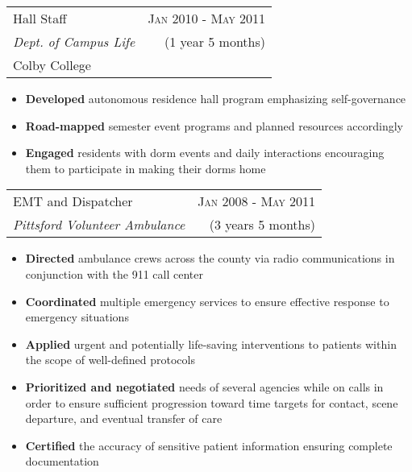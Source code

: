 \documentclass[10pt]{article} %
\begin{document}
{\begin{minipage}[t]{0.5\textwidth}

\begin{tabularx}{\linewidth}{ X r }
  {\large Hall Staff } & {\textsc{Jan 2010 - May 2011}} \\
  {\small{\textit{Dept. of Campus Life}}} & {\small{(1 year 5 months)}} \\
  {\small{Colby College}} 
\end{tabularx}
\begin{itemize}
  \item \textbf{Developed} autonomous residence hall program emphasizing self-governance
  \item \textbf{Road-mapped} semester event programs and planned resources accordingly
  \item \textbf{Engaged} residents with dorm events and daily interactions encouraging them to participate in making their dorms home
\end{itemize}


\begin{tabularx}{\linewidth}{ X r }
  {\large EMT and Dispatcher } & {\textsc{Jan 2008 - May 2011}} \\
  {\small\textit{Pittsford Volunteer Ambulance}} & {\small{(3 years 5 months)}}
\end{tabularx}
\begin{itemize}
  \item \textbf{Directed} ambulance crews across the county via radio communications in conjunction with the 911 call center
  \item \textbf{Coordinated} multiple emergency services to ensure effective response to emergency situations
  \item \textbf{Applied} urgent and potentially life-saving interventions to patients within the scope of well-defined protocols
\item \textbf{Prioritized and negotiated} needs of several agencies while on calls in order to ensure sufficient progression toward time targets for contact, scene departure, and eventual transfer of care
  \item \textbf{Certified} the accuracy of sensitive patient information ensuring complete documentation
\end{itemize}


\end{minipage}}
\end{document}

